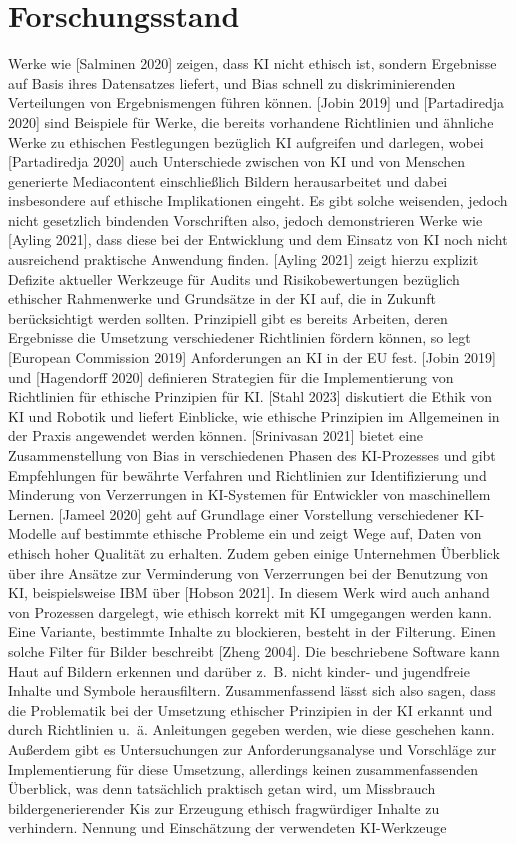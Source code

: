 \section{Forschungsstand}
Werke wie [Salminen 2020] zeigen, dass KI nicht ethisch ist, sondern Ergebnisse auf Basis ihres Datensatzes liefert, und Bias schnell zu diskriminierenden Verteilungen von Ergebnismengen führen können. [Jobin 2019] und [Partadiredja 2020] sind Beispiele für Werke, die bereits vorhandene Richtlinien und ähnliche Werke zu ethischen Festlegungen bezüglich KI aufgreifen und darlegen, wobei [Partadiredja 2020] auch Unterschiede zwischen von KI und von Menschen generierte Mediacontent einschließlich Bildern herausarbeitet und dabei insbesondere auf ethische Implikationen eingeht. Es gibt solche weisenden, jedoch nicht gesetzlich bindenden Vorschriften also, jedoch demonstrieren Werke wie [Ayling 2021], dass diese bei der Entwicklung und dem Einsatz von KI noch nicht ausreichend praktische Anwendung finden. [Ayling 2021] zeigt hierzu explizit Defizite aktueller Werkzeuge für Audits und Risikobewertungen bezüglich ethischer Rahmenwerke und Grundsätze in der KI auf, die in Zukunft berücksichtigt werden sollten. 
Prinzipiell gibt es bereits Arbeiten, deren Ergebnisse die Umsetzung verschiedener Richtlinien fördern können, so legt [European Commission 2019] Anforderungen an KI in der EU fest. [Jobin 2019] und [Hagendorff 2020] definieren Strategien für die Implementierung von Richtlinien für ethische Prinzipien für KI. [Stahl 2023] diskutiert die Ethik von KI und Robotik und liefert Einblicke, wie ethische Prinzipien im Allgemeinen in der Praxis angewendet werden können. [Srinivasan 2021] bietet eine Zusammenstellung von Bias in verschiedenen Phasen des KI-Prozesses und gibt Empfehlungen für bewährte Verfahren und Richtlinien zur Identifizierung und Minderung von Verzerrungen in KI-Systemen für Entwickler von maschinellem Lernen. [Jameel 2020] geht auf Grundlage einer Vorstellung verschiedener KI-Modelle auf bestimmte ethische Probleme ein und zeigt Wege auf, Daten von ethisch hoher Qualität zu erhalten.
Zudem geben einige Unternehmen Überblick über ihre Ansätze zur Verminderung von Verzerrungen bei der Benutzung von KI, beispielsweise IBM über [Hobson 2021]. In diesem Werk wird auch anhand von Prozessen dargelegt, wie ethisch korrekt mit KI umgegangen werden kann.
Eine Variante, bestimmte Inhalte zu blockieren, besteht in der Filterung. Einen solche Filter für Bilder beschreibt [Zheng 2004]. Die beschriebene Software kann Haut auf Bildern erkennen und darüber z. B. nicht kinder- und jugendfreie Inhalte und Symbole herausfiltern.
Zusammenfassend lässt sich also sagen, dass die Problematik bei der Umsetzung ethischer Prinzipien in der KI erkannt und durch Richtlinien u. ä. Anleitungen gegeben werden, wie diese geschehen kann. Außerdem gibt es Untersuchungen zur Anforderungsanalyse und Vorschläge zur Implementierung für diese Umsetzung, allerdings keinen zusammenfassenden Überblick, was denn tatsächlich praktisch getan wird, um Missbrauch bildergenerierender Kis zur Erzeugung ethisch fragwürdiger Inhalte zu verhindern.
Nennung und Einschätzung der verwendeten KI-Werkzeuge

